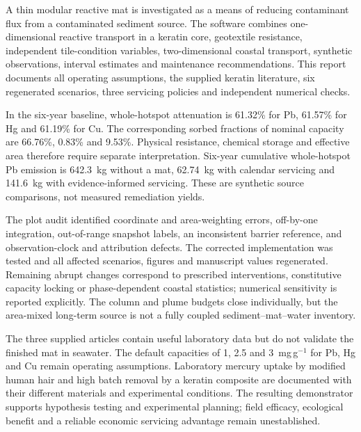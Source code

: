 A thin modular reactive mat is investigated as a means of reducing contaminant flux from a contaminated sediment source. The software combines one-dimensional reactive transport in a keratin core, geotextile resistance, independent tile-condition variables, two-dimensional coastal transport, synthetic observations, interval estimates and maintenance recommendations. This report documents all operating assumptions, the supplied keratin literature, six regenerated scenarios, three servicing policies and independent numerical checks.

In the six-year baseline, whole-hotspot attenuation is 61.32\% for Pb, 61.57\% for Hg and 61.19\% for Cu. The corresponding sorbed fractions of nominal capacity are 66.76\%, 0.83\% and 9.53\%. Physical resistance, chemical storage and effective area therefore require separate interpretation. Six-year cumulative whole-hotspot Pb emission is 642.3~kg without a mat, 62.74~kg with calendar servicing and 141.6~kg with evidence-informed servicing. These are synthetic source comparisons, not measured remediation yields.

The plot audit identified coordinate and area-weighting errors, off-by-one integration, out-of-range snapshot labels, an inconsistent barrier reference, and observation-clock and attribution defects. The corrected implementation was tested and all affected scenarios, figures and manuscript values regenerated. Remaining abrupt changes correspond to prescribed interventions, constitutive capacity locking or phase-dependent coastal statistics; numerical sensitivity is reported explicitly. The column and plume budgets close individually, but the area-mixed long-term source is not a fully coupled sediment--mat--water inventory.

The three supplied articles contain useful laboratory data but do not validate the finished mat in seawater. The default capacities of 1, 2.5 and 3~mg\,g$^{-1}$ for Pb, Hg and Cu remain operating assumptions. Laboratory mercury uptake by modified human hair and high batch removal by a keratin composite are documented with their different materials and experimental conditions. The resulting demonstrator supports hypothesis testing and experimental planning; field efficacy, ecological benefit and a reliable economic servicing advantage remain unestablished.

